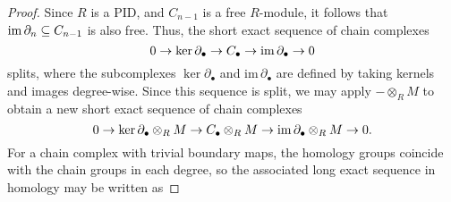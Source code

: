 \begin{proof}
Since $R$ is a PID, and $C_{n-1}$ is a free $R$-module, it follows that $\operatorname{im} \partial_n \subseteq C_{n-1}$ is also free. Thus, the short exact sequence of chain complexes
\begin{equation*}
    0 \to \ker \partial_\bullet \to C_\bullet \to \operatorname{im} \partial_\bullet \to 0
\end{equation*}
splits, where the subcomplexes $\ker \partial_\bullet$ and $\mathrm{im}\, \partial_\bullet$ are defined by taking kernels and images degree-wise. Since this sequence is split, we may apply $- \otimes_R M$ to obtain a new short exact sequence of chain complexes
\begin{equation*}
    0 \to \ker \partial_\bullet \otimes_R M \to C_\bullet \otimes_R M \to \operatorname{im} \partial_\bullet \otimes_R M \to 0.
\end{equation*}
For a chain complex with trivial boundary maps, the homology groups coincide with the chain groups in each degree, so the associated long exact sequence in homology may be written as


\end{proof}
